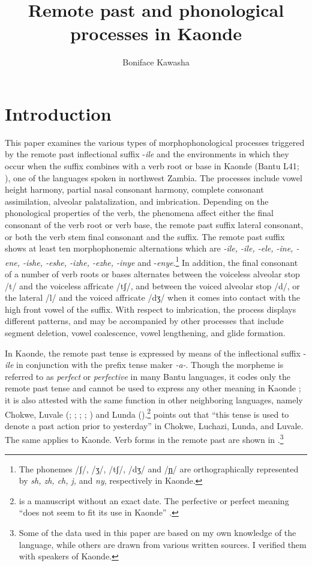\documentclass[output=paper]{langsci/langscibook}
\title{Remote past and phonological processes in Kaonde}
\author{%
Boniface Kawasha\affiliation{Savannah State University}
}
\begin{document}

\section{Introduction}\label{§1:introduction.kawasha}

This paper examines the various types of morphophonological processes triggered by the remote past inflectional suffix -\textit{ile} and the environments in which they occur when the suffix combines with a verb root or base in Kaonde (Bantu L41; \citealt{guthrie1967}), one of the languages spoken in northwest Zambia. The processes include vowel height harmony, partial nasal consonant harmony, complete consonant assimilation, alveolar palatalization, and imbrication. Depending on the phonological properties of the verb, the phenomena affect either the final consonant of the verb root or verb base, the remote past suffix lateral consonant, or both the verb stem final consonant and the suffix. The remote past suffix shows at least ten morphophonemic alternations which are \textit{-ile, -ile, -ele, -ine, -ene, -ishe, -eshe, -izhe, -ezhe, -inye} and -\textit{enye}.\footnote{The phonemes /ʃ/, /ʒ/, /tʃ/, /dʒ/ and /\href{http://en.wikipedia.org/wiki/Ɲ}{ɲ}/ are orthographically represented by \textit{sh, zh, ch, j,} and \textit{ny}, respectively in Kaonde.} In addition, the final consonant of a number of verb roots or bases alternates between the voiceless alveolar stop /t/ and the voiceless affricate /tʃ/, and between the voiced alveolar stop /d/, or the lateral /l/ and the voiced affricate /dʒ/ when it comes into contact with the high front vowel of the suffix. With respect to imbrication, the process displays different patterns, and may be accompanied by other processes that include segment deletion, vowel coalescence, vowel lengthening, and glide formation.

In Kaonde, the remote past tense is expressed by means of the inflectional suffix -\textit{ile} in conjunction with the prefix tense maker \textit{-a-}. Though the morpheme is referred to as \textit{perfect} or \textit{perfective} in many Bantu languages, it codes only the remote past tense and cannot be used to express any other meaning in Kaonde \citep[137]{wright1977}; it is also attested with the same function in other neighboring languages, namely Chokwe, Luvale (\citealt{white1947}; \citeyear{white1949}; \citeyear{white196x}; \citealt{horton1949}; \citealt{yukawa1987}) and Lunda (\citealt{fisher1984,kawasha2003}).\footnote{\citep{white196x} is a manuscript without an exact date. The perfective or perfect meaning “does not seem to fit its use in Kaonde” \citep{wright1977}.} \citet[6]{white1947} points out that “this tense is used to denote a past action prior to yesterday” in Chokwe, Luchazi, Lunda, and Luvale. The same applies to Kaonde. Verb forms in the remote past are shown in .\footnote{Some of the data used in this paper are based on my own knowledge of the language, while others are drawn from various written sources. I verified them with speakers of Kaonde.}
\end{document}
